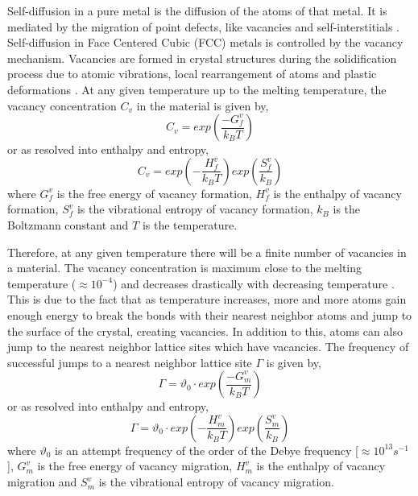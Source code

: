 \documentclass{article}
\begin{document}
Self-diffusion in a pure metal is the diffusion of the atoms of that metal. It is mediated by the migration of point defects, like vacancies and self-interstitials \cite{Shewmon2016}. Self-diffusion in Face Centered Cubic (FCC) metals is controlled by the vacancy mechanism. Vacancies are formed in crystal structures during the solidification process due to atomic vibrations, local rearrangement of atoms and plastic deformations \cite{ehrhart1992properties}. At any given temperature up to the melting temperature, the vacancy concentration $C_v$ in the material is given by,
%
\begin{equation}
C_v = exp\left(\dfrac{-G^v_f}{k_B T}\right)
\end{equation}
%
or as resolved into enthalpy and entropy,
%
\begin{equation}
C_v = exp\left(-\dfrac{H^v_f}{k_B T}\right) exp\left(\dfrac{S^v_f}{k_B}\right)
\end{equation}
%
where $G^v_f$ is the free energy of vacancy formation, $H^v_f$ is the enthalpy of vacancy formation, $S^v_f$ is the vibrational entropy of vacancy formation, $k_B$ is the Boltzmann constant and $T$ is the temperature. 

Therefore, at any given temperature there will be a finite number of vacancies in a material. The vacancy concentration is maximum close to the melting temperature ($\approx10^{-4}$) and decreases drastically with decreasing temperature \cite{Gottstein2004}. This is due to the fact that as temperature increases, more and more atoms gain enough energy to break the bonds with their nearest neighbor atoms and jump to the surface of the crystal, creating vacancies. In addition to this, atoms can also jump to the nearest neighbor lattice sites which have vacancies. The frequency of successful jumps to a nearest neighbor lattice site $\Gamma$ is given by,
%
\begin{equation}
\Gamma = \vartheta_0 \cdot exp\left(\dfrac{-G^v_m}{k_B T}\right)
\end{equation}
%
or as resolved into enthalpy and entropy,
%
\begin{equation}
\Gamma = \vartheta_0 \cdot exp\left(-\dfrac{H^v_m}{k_B T}\right) exp\left(\dfrac{S^v_m}{k_B}\right)
\end{equation}
%
where $\vartheta_0$ is an attempt frequency of the order of the Debye frequency [$\approx10^{13}s^{-1}$],  $G^v_m$ is the free energy of vacancy migration, $H^v_m$ is the enthalpy of vacancy migration and $S^v_m$ is the vibrational entropy of vacancy migration.
\end{document}
